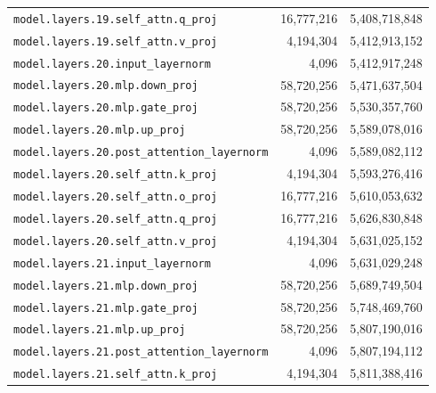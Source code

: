 \documentclass[10pt,a4paper]{article}
\theoremstyle{definition}
\begin{document}
\begin{appendices}
\begin{longtable}{p{9.5cm}rr}
\texttt{model.\allowbreak{}layers.\allowbreak{}19.\allowbreak{}self\_attn.\allowbreak{}q\_proj} & 16,777,216 & 5,408,718,848 \\
\texttt{model.\allowbreak{}layers.\allowbreak{}19.\allowbreak{}self\_attn.\allowbreak{}v\_proj} & 4,194,304 & 5,412,913,152 \\
\texttt{model.\allowbreak{}layers.\allowbreak{}20.\allowbreak{}input\_layernorm} & 4,096 & 5,412,917,248 \\
\texttt{model.\allowbreak{}layers.\allowbreak{}20.\allowbreak{}mlp.\allowbreak{}down\_proj} & 58,720,256 & 5,471,637,504 \\
\texttt{model.\allowbreak{}layers.\allowbreak{}20.\allowbreak{}mlp.\allowbreak{}gate\_proj} & 58,720,256 & 5,530,357,760 \\
\texttt{model.\allowbreak{}layers.\allowbreak{}20.\allowbreak{}mlp.\allowbreak{}up\_proj} & 58,720,256 & 5,589,078,016 \\
\texttt{model.\allowbreak{}layers.\allowbreak{}20.\allowbreak{}post\_attention\_layernorm} & 4,096 & 5,589,082,112 \\
\texttt{model.\allowbreak{}layers.\allowbreak{}20.\allowbreak{}self\_attn.\allowbreak{}k\_proj} & 4,194,304 & 5,593,276,416 \\
\texttt{model.\allowbreak{}layers.\allowbreak{}20.\allowbreak{}self\_attn.\allowbreak{}o\_proj} & 16,777,216 & 5,610,053,632 \\
\texttt{model.\allowbreak{}layers.\allowbreak{}20.\allowbreak{}self\_attn.\allowbreak{}q\_proj} & 16,777,216 & 5,626,830,848 \\
\texttt{model.\allowbreak{}layers.\allowbreak{}20.\allowbreak{}self\_attn.\allowbreak{}v\_proj} & 4,194,304 & 5,631,025,152 \\
\texttt{model.\allowbreak{}layers.\allowbreak{}21.\allowbreak{}input\_layernorm} & 4,096 & 5,631,029,248 \\
\texttt{model.\allowbreak{}layers.\allowbreak{}21.\allowbreak{}mlp.\allowbreak{}down\_proj} & 58,720,256 & 5,689,749,504 \\
\texttt{model.\allowbreak{}layers.\allowbreak{}21.\allowbreak{}mlp.\allowbreak{}gate\_proj} & 58,720,256 & 5,748,469,760 \\
\texttt{model.\allowbreak{}layers.\allowbreak{}21.\allowbreak{}mlp.\allowbreak{}up\_proj} & 58,720,256 & 5,807,190,016 \\
\texttt{model.\allowbreak{}layers.\allowbreak{}21.\allowbreak{}post\_attention\_layernorm} & 4,096 & 5,807,194,112 \\
\texttt{model.\allowbreak{}layers.\allowbreak{}21.\allowbreak{}self\_attn.\allowbreak{}k\_proj} & 4,194,304 & 5,811,388,416 \\

\end{longtable}
\end{appendices}
\end{document}
